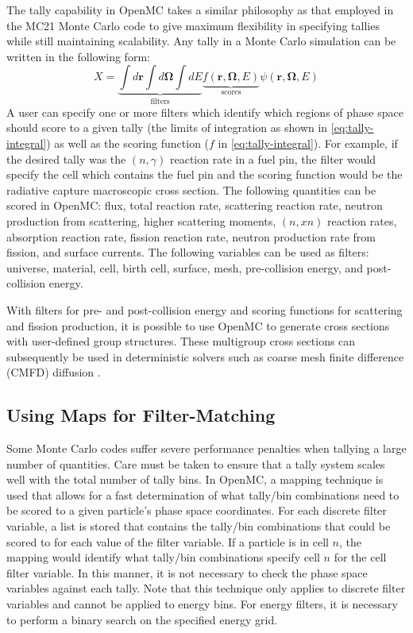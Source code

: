 The tally capability in OpenMC takes a similar philosophy as that employed in
the MC21 Monte Carlo code \cite{mc-sutton-2007} to give maximum flexibility in
specifying tallies while still maintaining scalability. Any tally in a Monte
Carlo simulation can be written in the following form:
\begin{equation}
  \label{eq:tally-integral}
  X = \underbrace{\int d\mathbf{r} \int d\mathbf{\Omega} \int
    dE}_{\text{filters}} \underbrace{f(\mathbf{r}, \mathbf{\Omega},
    E)}_{\text{scores}} \psi (\mathbf{r}, \mathbf{\Omega}, E)
\end{equation}
A user can specify one or more filters which identify which regions of phase
space should score to a given tally (the limits of integration as shown in
\eqref{eq:tally-integral}) as well as the scoring function ($f$ in
\eqref{eq:tally-integral}). For example, if the desired tally was the
$(n,\gamma)$ reaction rate in a fuel pin, the filter would specify the cell
which contains the fuel pin and the scoring function would be the radiative
capture macroscopic cross section. The following quantities can be scored in
OpenMC: flux, total reaction rate, scattering reaction rate, neutron production
from scattering, higher scattering moments, $(n,xn)$ reaction rates, absorption
reaction rate, fission reaction rate, neutron production rate from fission, and
surface currents. The following variables can be used as filters: universe,
material, cell, birth cell, surface, mesh, pre-collision energy, and
post-collision energy.

With filters for pre- and post-collision energy and scoring functions for
scattering and fission production, it is possible to use OpenMC to generate
cross sections with user-defined group structures. These multigroup cross
sections can subsequently be used in deterministic solvers such as coarse mesh
finite difference (CMFD) diffusion \cite{physor-lee-2010}.

\subsection{Using Maps for Filter-Matching}

Some Monte Carlo codes suffer severe performance penalties when tallying a large
number of quantities. Care must be taken to ensure that a tally system scales
well with the total number of tally bins. In OpenMC, a mapping technique is used
that allows for a fast determination of what tally/bin combinations need to be
scored to a given particle's phase space coordinates. For each discrete filter
variable, a list is stored that contains the tally/bin combinations that could
be scored to for each value of the filter variable. If a particle is in cell
$n$, the mapping would identify what tally/bin combinations specify cell
$n$ for the cell filter variable. In this manner, it is not necessary to
check the phase space variables against each tally. Note that this technique
only applies to discrete filter variables and cannot be applied to energy
bins. For energy filters, it is necessary to perform a binary search on the
specified energy grid.

